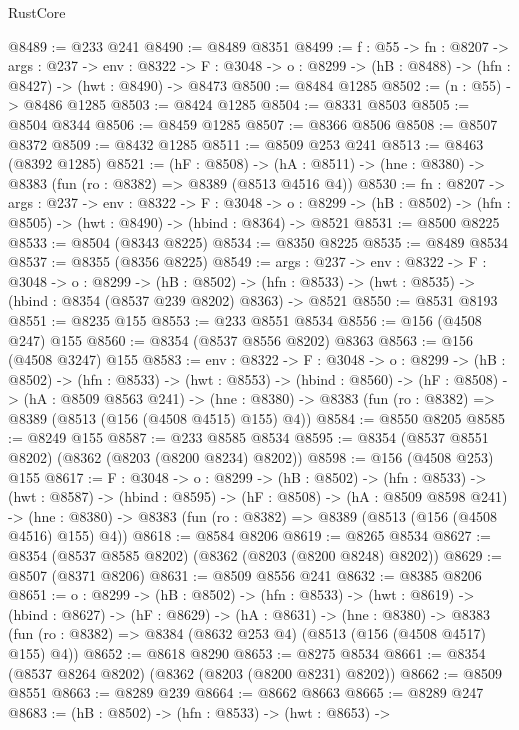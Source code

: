 \begin{lexlean}{RustCore}
\begin{coremodule}
@8489 := @233 @241
@8490 := @8489 @8351
@8499 := {f : @55} ->
  {fn : @8207} ->
  {args : @237} ->
  {env : @8322} ->
  {F : @3048} -> {o : @8299} -> (hB : @8488) -> (hfn : @8427) -> (hwt : @8490) -> @8473
@8500 := @8484 @1285
@8502 := (n : @55) -> @8486 @1285
@8503 := @8424 @1285
@8504 := @8331 @8503
@8505 := @8504 @8344
@8506 := @8459 @1285
@8507 := @8366 @8506
@8508 := @8507 @8372
@8509 := @8432 @1285
@8511 := @8509 @253 @241
@8513 := @8463 (@8392 @1285)
@8521 := (hF : @8508) ->
  (hA : @8511) -> (hne : @8380) -> @8383 (fun (ro : @8382) => @8389 (@8513 @4516 @4))
@8530 := {fn : @8207} ->
  {args : @237} ->
  {env : @8322} ->
  {F : @3048} ->
  {o : @8299} -> (hB : @8502) -> (hfn : @8505) -> (hwt : @8490) -> (hbind : @8364) -> @8521
@8531 := @8500 @8225
@8533 := @8504 (@8343 @8225)
@8534 := @8350 @8225
@8535 := @8489 @8534
@8537 := @8355 (@8356 @8225)
@8549 := {args : @237} ->
  {env : @8322} ->
  {F : @3048} ->
  {o : @8299} ->
  (hB : @8502) ->
  (hfn : @8533) -> (hwt : @8535) -> (hbind : @8354 (@8537 @239 @8202) @8363) -> @8521
@8550 := @8531 @8193
@8551 := @8235 @155
@8553 := @233 @8551 @8534
@8556 := @156 (@4508 @247) @155
@8560 := @8354 (@8537 @8556 @8202) @8363
@8563 := @156 (@4508 @3247) @155
@8583 := {env : @8322} ->
  {F : @3048} ->
  {o : @8299} ->
  (hB : @8502) ->
  (hfn : @8533) ->
  (hwt : @8553) ->
  (hbind : @8560) ->
  (hF : @8508) ->
  (hA : @8509 @8563 @241) ->
  (hne : @8380) -> @8383 (fun (ro : @8382) => @8389 (@8513 (@156 (@4508 @4515) @155) @4))
@8584 := @8550 @8205
@8585 := @8249 @155
@8587 := @233 @8585 @8534
@8595 := @8354 (@8537 @8551 @8202) (@8362 (@8203 (@8200 @8234) @8202))
@8598 := @156 (@4508 @253) @155
@8617 := {F : @3048} ->
  {o : @8299} ->
  (hB : @8502) ->
  (hfn : @8533) ->
  (hwt : @8587) ->
  (hbind : @8595) ->
  (hF : @8508) ->
  (hA : @8509 @8598 @241) ->
  (hne : @8380) -> @8383 (fun (ro : @8382) => @8389 (@8513 (@156 (@4508 @4516) @155) @4))
@8618 := @8584 @8206
@8619 := @8265 @8534
@8627 := @8354 (@8537 @8585 @8202) (@8362 (@8203 (@8200 @8248) @8202))
@8629 := @8507 (@8371 @8206)
@8631 := @8509 @8556 @241
@8632 := @8385 @8206
@8651 := {o : @8299} ->
  (hB : @8502) ->
  (hfn : @8533) ->
  (hwt : @8619) ->
  (hbind : @8627) ->
  (hF : @8629) ->
  (hA : @8631) ->
  (hne : @8380) ->
  @8383 (fun (ro : @8382) => @8384 (@8632 @253 @4) (@8513 (@156 (@4508 @4517) @155) @4))
@8652 := @8618 @8290
@8653 := @8275 @8534
@8661 := @8354 (@8537 @8264 @8202) (@8362 (@8203 (@8200 @8231) @8202))
@8662 := @8509 @8551
@8663 := @8289 @239
@8664 := @8662 @8663
@8665 := @8289 @247
@8683 := (hB : @8502) ->
  (hfn : @8533) ->
  (hwt : @8653) ->

\end{coremodule}
\end{lexlean}
